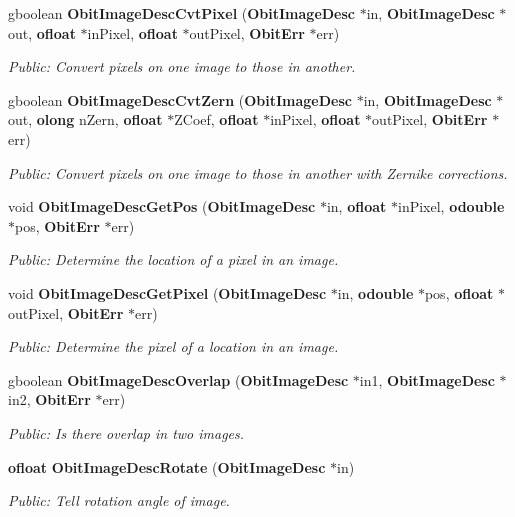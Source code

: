 \begin{CompactItemize}
gboolean {\bf Obit\-Image\-Desc\-Cvt\-Pixel} ({\bf Obit\-Image\-Desc} $\ast$in, {\bf Obit\-Image\-Desc} $\ast$out, {\bf ofloat} $\ast$in\-Pixel, {\bf ofloat} $\ast$out\-Pixel, {\bf Obit\-Err} $\ast$err)
\begin{CompactList}\small\item\em Public: Convert pixels on one image to those in another. \item\end{CompactList}\item 
gboolean {\bf Obit\-Image\-Desc\-Cvt\-Zern} ({\bf Obit\-Image\-Desc} $\ast$in, {\bf Obit\-Image\-Desc} $\ast$out, {\bf olong} n\-Zern, {\bf ofloat} $\ast$ZCoef, {\bf ofloat} $\ast$in\-Pixel, {\bf ofloat} $\ast$out\-Pixel, {\bf Obit\-Err} $\ast$err)
\begin{CompactList}\small\item\em Public: Convert pixels on one image to those in another with Zernike corrections. \item\end{CompactList}\item 
void {\bf Obit\-Image\-Desc\-Get\-Pos} ({\bf Obit\-Image\-Desc} $\ast$in, {\bf ofloat} $\ast$in\-Pixel, {\bf odouble} $\ast$pos, {\bf Obit\-Err} $\ast$err)
\begin{CompactList}\small\item\em Public: Determine the location of a pixel in an image. \item\end{CompactList}\item 
void {\bf Obit\-Image\-Desc\-Get\-Pixel} ({\bf Obit\-Image\-Desc} $\ast$in, {\bf odouble} $\ast$pos, {\bf ofloat} $\ast$out\-Pixel, {\bf Obit\-Err} $\ast$err)
\begin{CompactList}\small\item\em Public: Determine the pixel of a location in an image. \item\end{CompactList}\item 
gboolean {\bf Obit\-Image\-Desc\-Overlap} ({\bf Obit\-Image\-Desc} $\ast$in1, {\bf Obit\-Image\-Desc} $\ast$in2, {\bf Obit\-Err} $\ast$err)
\begin{CompactList}\small\item\em Public: Is there overlap in two images. \item\end{CompactList}\item 
{\bf ofloat} {\bf Obit\-Image\-Desc\-Rotate} ({\bf Obit\-Image\-Desc} $\ast$in)
\begin{CompactList}\small\item\em Public: Tell rotation angle of image. \item\end{CompactList}\item 

\end{CompactItemize}
